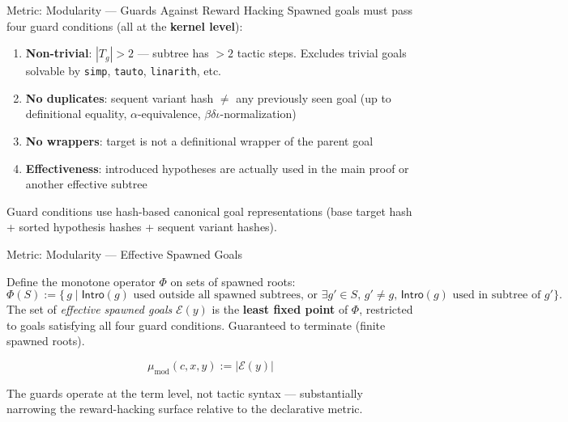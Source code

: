 \begin{frame}{Metric: Modularity --- Guards Against Reward Hacking}
\vspace{0.3em}
Spawned goals must pass four guard conditions (all at the \textbf{kernel level}):
\vspace{0.3em}
\begin{enumerate}\setlength{\itemsep}{6pt}
  \item \textbf{Non-trivial}: $|T_g| > 2$ --- subtree has $> 2$ tactic steps. Excludes trivial goals solvable by \texttt{simp}, \texttt{tauto}, \texttt{linarith}, etc.
  \item \textbf{No duplicates}: sequent variant hash $\neq$ any previously seen goal (up to definitional equality, $\alpha$-equivalence, $\beta\delta\iota$-normalization)
  \item \textbf{No wrappers}: target is not a definitional wrapper of the parent goal
  \item \textbf{Effectiveness}: introduced hypotheses are actually used in the main proof or another effective subtree
\end{enumerate}
\vspace{0.3em}
\small Guard conditions use hash-based canonical goal representations (base target hash + sorted hypothesis hashes + sequent variant hashes).
\end{frame}

\begin{frame}{Metric: Modularity --- Effective Spawned Goals}
\vspace{0.3em}
\begin{definition}
Define the monotone operator $\Phi$ on sets of spawned roots:
\[
\Phi(S) := \bigl\{\, g \;\big|\; \mathsf{Intro}(g) \text{ used outside all spawned subtrees, or } \exists g' \in S,\, g' \neq g,\, \mathsf{Intro}(g) \text{ used in subtree of } g' \bigr\}.
\]
The set of \emph{effective spawned goals} $\mathcal{E}(y)$ is the \textbf{least fixed point} of $\Phi$, restricted to goals satisfying all four guard conditions. Guaranteed to terminate (finite spawned roots).
\end{definition}
\vspace{0.4em}
\begin{definition}
\[
  \mu_{\mathrm{mod}}(c,x,y) := \bigl|\mathcal{E}(y)\bigr|
\]
\end{definition}
\vspace{0.3em}
\small The guards operate at the term level, not tactic syntax --- substantially narrowing the reward-hacking surface relative to the declarative metric.
\end{frame}

